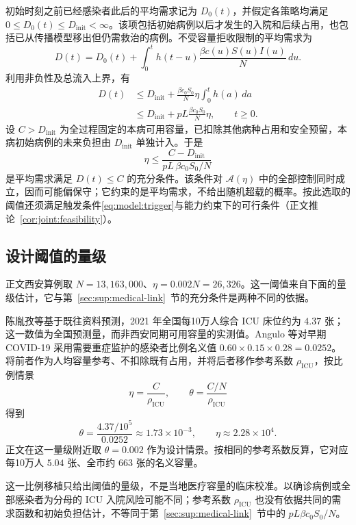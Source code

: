 初始时刻之前已经感染者此后的平均需求记为 $D_0(t)$，并假定各策略均满足 $0\le D_0(t)\le D_{\mathrm{init}}<\infty$。该项包括初始病例以后才发生的入院和后续占用，也包括已从传播模型移出但仍需救治的病例。不受容量拒收限制的平均需求为
\[
D(t)=D_0(t)+\int_0^t h(t-u)
\frac{\beta c(u)S(u)I(u)}{N}\,du.
\]
利用非负性及总流入上界，有
\[
\begin{aligned}
D(t)
&\le D_{\mathrm{init}}+
\frac{\beta c_0S_0}{N}\eta\int_0^t h(a)\,da\\
&\le D_{\mathrm{init}}+pL\frac{\beta c_0S_0}{N}\eta,
\qquad t\ge0.
\end{aligned}
\]
设 $C>D_{\mathrm{init}}$ 为全过程固定的本病可用容量，已扣除其他病种占用和安全预留，本病初始病例的未来负担由 $D_{\mathrm{init}}$ 单独计入。于是
\[
\eta\le\frac{C-D_{\mathrm{init}}}{pL\,\beta c_0S_0/N}
\]
是平均需求满足 $D(t)\le C$ 的充分条件。该条件对 $\mathcal A(\eta)$ 中的全部控制同时成立，因而可能偏保守；它约束的是平均需求，不给出随机超载的概率。按此选取的阈值还须满足触发条件\eqref{eq:model:trigger}与能力约束下的可行条件（正文推论~\ref{cor:joint:feasibility}）。

\subsection{设计阈值的量级}
\label{sec:sup:threshold-scale}
正文西安算例取 $N=13{,}163{,}000$\cite{XianStat2021}、$\eta=0.002N=26{,}326$。这一阈值来自下面的量级估计，它与第~\ref{sec:sup:medical-link}~节的充分条件是两种不同的依据。

陈胤孜等\cite{Chen2021ICUForecast}基于既往资料预测，2021 年全国每10万人综合 ICU 床位约为 $4.37$ 张；这一数值为全国预测量，而非西安同期可用容量的实测值。Angulo 等\cite[补充材料 S4.1]{Angulo2021}对早期 COVID-19 采用需要重症监护的感染者比例名义值 $0.60\times0.15\times0.28=0.0252$。将前者作为人均容量参考、不扣除既有占用，并将后者移作参考系数 $\rho_{\mathrm{ICU}}$，按比例情景
\[
\eta=\frac{C}{\rho_{\mathrm{ICU}}},\qquad
\theta=\frac{C/N}{\rho_{\mathrm{ICU}}}
\]
得到
\[
\theta=\frac{4.37/10^5}{0.0252}\approx1.73\times10^{-3},
\qquad \eta\approx2.28\times10^4.
\]
正文在这一量级附近取 $\theta=0.002$ 作为设计情景。按相同的参考系数反算，它对应每10万人 $5.04$ 张、全市约 $663$ 张的名义容量。

这一比例移植只给出阈值的量级，不是当地医疗容量的临床校准。以确诊病例或全部感染者为分母的 ICU 入院风险可能不同\cite{Pung2023Undetected}；参考系数 $\rho_{\mathrm{ICU}}$ 也没有依据共同的需求函数和初始负担估计，不等同于第~\ref{sec:sup:medical-link}~节中的 $pL\beta c_0S_0/N$。
